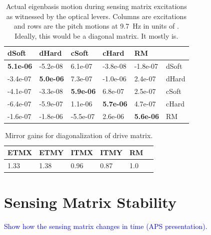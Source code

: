 \begin{table}
\centering
\caption[Actual eigenbasis motion during sensing matrix excitations]{Actual eigenbasis motion during sensing matrix excitations as
  witnessed by the optical levers. Columns are excitations and rows are
  the pitch motions at 9.7~Hz in units of \microrad. Ideally, this
  would be a diagonal matrix. It mostly is.}
\begin{tabular}{l l l l l l}
\hline
dSoft & dHard  & cSoft & cHard & RM & \\
\hline
   \textbf{5.1e-06} & -5.2e-08  & 6.1e-07 & -3.8e-08 &  -1.8e-07 & dSoft\\
  -3.4e-07 &  \textbf{5.0e-06}  &  7.3e-07 & -1.0e-06 &  2.4e-07 & dHard\\
  -4.1e-07 & -3.3e-08 &  \textbf{5.9e-06} &  6.8e-07 &  2.5e-07 & cSoft\\
  -6.4e-07 & -5.9e-07 &  1.1e-06 &  \textbf{5.7e-06} &  4.7e-07 & cHard\\
  -1.6e-07 & -1.8e-06 & -5.5e-07 &   2.6e-06 &  \textbf{5.6e-06} & RM\\
\hline
\end{tabular}
\label{table:excitations_calibrated}
\end{table}



\begin{table}
\centering
\caption[Mirror gains for diagonalization of drive matrix]{Mirror
  gains for diagonalization of drive matrix.} 
\begin{tabular}{l l l l l l}
\hline
ETMX & ETMY & ITMX & ITMY & RM & \\
\hline
1.33 & 1.38 & 0.96 & 0.87 & 1.0 \\
\hline
\end{tabular}
\end{table}




\section{Sensing Matrix Stability}
\textcolor{blue}{Show how the sensing matrix changes in time (APS
  presentation).}




